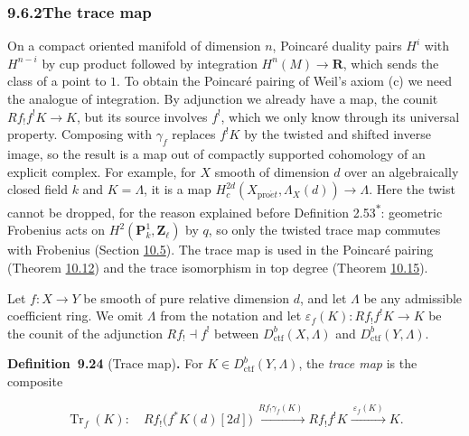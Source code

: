 \documentclass[11pt]{article}
\newenvironment{bpstatement}[2]{\par\addvspace{0.6\baselineskip}\noindent\textbf{#1}#2\textbf{.}\enspace\ignorespaces}
  {\par\addvspace{0.4\baselineskip}}
\newcommand{\bpout}[1]{#1\textsuperscript{\hyperlink{bp-outside}{\ensuremath{\ast}}}}
\begin{document}
\subsubsection*{\texorpdfstring{9.6.2\quad The trace map}{9.6.2 The trace map}}
\label{bp83}%
\label{bp84}%
On a compact oriented manifold of dimension \(n\), Poincaré duality pairs \(H^i\) with \(H^{n-i}\) by cup product followed by integration \(H^n(M)\to\mathbf R\), which sends the class of a point to \(1\). To obtain the Poincaré pairing of Weil's axiom (c) we need the analogue of integration. By adjunction we already have a map, the counit \(Rf_!f^!K\to K\), but its source involves \(f^!\), which we only know through its universal property. Composing with \(\gamma_f\) replaces \(f^!K\) by the twisted and shifted inverse image, so the result is a map out of compactly supported cohomology of an explicit complex. For example, for \(X\) smooth of dimension \(d\) over an algebraically closed field \(k\) and \(K=\Lambda\), it is a map \(H_c^{2d}(X_{\mathrm{pro}\acute{e}t},\Lambda_X(d))\to\Lambda\). Here the twist cannot be dropped, for the reason explained before Definition \bpout{2.53}: geometric Frobenius acts on \(H^2(\mathbf P^1_k,\mathbf Z_\ell)\) by \(q\), so only the twisted trace map commutes with Frobenius (Section \hyperref[bp154]{10.5}). The trace map is used in the Poincaré pairing (Theorem \hyperref[bp137]{10.12}) and the trace isomorphism in top degree (Theorem \hyperref[bp146]{10.15}).

Let \(f:X\to Y\) be smooth of pure relative dimension \(d\), and let \(\Lambda\) be any admissible coefficient ring. We omit \(\Lambda\) from the notation and let \(\varepsilon_f(K):Rf_!f^!K\to K\) be the counit of the adjunction \(Rf_!\dashv f^!\) between \(D^b_{\mathrm{ctf}}(X,\Lambda)\) and \(D^b_{\mathrm{ctf}}(Y,\Lambda)\).

\label{bp85}%
\begin{bpstatement}{Definition~9.24}{ (Trace map)}
For \(K\in D^b_{\mathrm{ctf}}(Y,\Lambda)\), the \emph{trace map} is the composite

\[
\operatorname{Tr}_{f}(K):\quad
Rf_!\bigl(f^{*}K(d)[2d]\bigr)
\xrightarrow{\ Rf_!\gamma_{f}(K)\ }
Rf_!f^!K
\xrightarrow{\ \varepsilon_{f}(K)\ }K.
\tag{9.25}
\]
\end{bpstatement}
\end{document}
